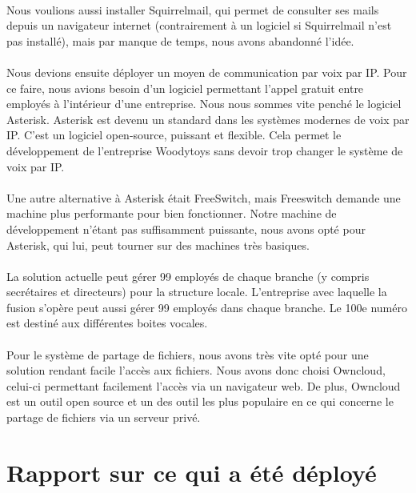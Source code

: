 \documentclass[a4paper,12pt]{article}
\begin{document}
	\paragraph{} Nous voulions aussi installer Squirrelmail, qui permet de consulter ses mails depuis
un navigateur internet (contrairement à un logiciel si Squirrelmail n’est pas installé),
mais par manque de temps, nous avons abandonné l’idée.
	\paragraph{} Nous devions ensuite déployer un moyen de communication par voix par IP. Pour
ce faire, nous avions besoin d’un logiciel permettant l’appel gratuit entre employés
à l’intérieur d’une entreprise. Nous nous sommes vite penché le logiciel Asterisk.
Asterisk est devenu un standard dans les systèmes modernes de voix par IP. C’est
un logiciel open-source, puissant et flexible. Cela permet le développement de l’entreprise
Woodytoys sans devoir trop changer le système de voix par IP.
	\paragraph{} Une autre alternative à Asterisk était FreeSwitch, mais Freeswitch demande une
machine plus performante pour bien fonctionner. Notre machine de développement
n’étant pas suffisamment puissante, nous avons opté pour Asterisk, qui lui, peut
tourner sur des machines très basiques.
	\paragraph{} La solution actuelle peut gérer 99 employés de chaque branche (y compris secrétaires
et directeurs) pour la structure locale. L’entreprise avec laquelle la fusion
s’opère peut aussi gérer 99 employés dans chaque branche. Le 100e numéro est destiné
aux différentes boites vocales.

	\paragraph{} Pour le système de partage de fichiers, nous avons très vite opté pour une solution rendant facile l'accès aux fichiers. Nous avons donc choisi Owncloud, celui-ci permettant facilement l'accès via un navigateur web. De plus, Owncloud est un outil open source et un des outil les plus populaire en ce qui concerne le partage de fichiers via un serveur privé.

\section{Rapport sur ce qui a été déployé}
\end{document}

